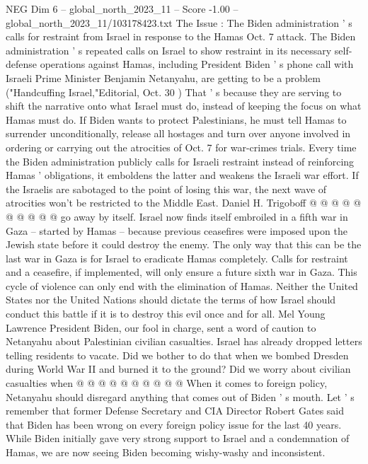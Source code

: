 \begin{textsample}{NEG Dim 6 – global\_north\_2023\_11 – Score -1.00 – global\_north\_2023\_11/103178423.txt}  \label{ex:f6_neg_203}
The Issue : The Biden administration ' s calls for restraint from Israel in response to the Hamas Oct. 7 attack.
The Biden administration ' s repeated calls on Israel to show restraint in its necessary self-defense operations against Hamas, including President Biden ' s phone call with Israeli Prime Minister Benjamin Netanyahu, are getting to be a problem ("Handcuffing Israel,"Editorial, Oct. 30 ) That ' s because they are serving to shift the narrative onto what Israel must do, instead of keeping the focus on what Hamas must do.
If Biden wants to protect Palestinians, he must tell Hamas to surrender unconditionally, release all hostages and turn over anyone involved in ordering or carrying out the atrocities of Oct. 7 for war-crimes trials.
Every time the Biden administration publicly calls for Israeli restraint instead of reinforcing Hamas ' obligations, it emboldens the latter and weakens the Israeli war effort.
If the Israelis are sabotaged to the point of losing this war, the next wave of atrocities won't be restricted to the Middle East.
Daniel H.
Trigoboff @ @ @ @ @ @ @ @ @ @ go away by itself.
Israel now finds itself embroiled in a fifth war in Gaza -- started by Hamas -- because previous ceasefires were imposed upon the Jewish state before it could destroy the enemy.
The only way that this can be the last war in Gaza is for Israel to eradicate Hamas completely.
Calls for restraint and a ceasefire, if implemented, will only ensure a future sixth war in Gaza.
This cycle of violence can only end with the elimination of Hamas.
Neither the United States nor the United Nations should dictate the terms of how Israel should conduct this battle if it is to destroy this evil once and for all.
Mel Young Lawrence President Biden, our fool in charge, sent a word of caution to Netanyahu about Palestinian civilian casualties.
Israel has already dropped letters telling residents to vacate.
Did we bother to do that when we bombed Dresden during World War II and burned it to the ground?
Did we worry about civilian casualties when @ @ @ @ @ @ @ @ @ @ When it comes to foreign policy, Netanyahu should disregard anything that comes out of Biden ' s mouth.
Let ' s remember that former Defense Secretary and CIA Director Robert Gates said that Biden has been wrong on every foreign policy issue for the last 40 years.
While Biden initially gave very strong support to Israel and a condemnation of Hamas, we are now seeing Biden becoming wishy-washy and inconsistent.

\end{textsample}
